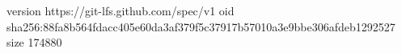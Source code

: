 version https://git-lfs.github.com/spec/v1
oid sha256:88fa8b564fdacc405e60da3af379f5c37917b57010a3e9bbe306afdeb1292527
size 174880
